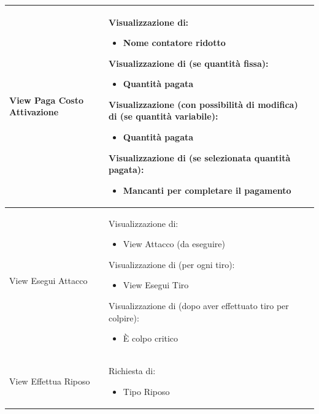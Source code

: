 \documentclass[a4paper, 11pt]{article}
\begin{document}
\begin{adjustwidth}{-1.5cm}{-1.5cm}
\begin{center}
\begin{longtable}{|p{5cm}|p{5cm}|p{5cm}|}
        View Paga Costo Attivazione & 
        Visualizzazione di:
        \begin{itemize}
            \item Nome contatore ridotto
        \end{itemize} 
        
        Visualizzazione di (se quantità fissa):
        \begin{itemize}
            \item Quantità pagata
        \end{itemize} 
        
        Visualizzazione (con possibilità di modifica) di (se quantità variabile):
        \begin{itemize}
            \item Quantità pagata
        \end{itemize} 
        
        Visualizzazione di (se selezionata quantità pagata):
        \begin{itemize}
            \item Mancanti per completare il pagamento
        \end{itemize} &  \\ \hline
        
        View Esegui Attacco & 
        Visualizzazione di:
        \begin{itemize}
            \item View Attacco (da eseguire)
        \end{itemize} 
        
        Visualizzazione di (per ogni tiro):
        \begin{itemize}
            \item View Esegui Tiro
        \end{itemize} 
        
        Visualizzazione di (dopo aver effettuato tiro per colpire):
        \begin{itemize}
            \item È colpo critico
        \end{itemize} &  \\ \hline
        
        View Effettua Riposo & 
        Richiesta di:
        \begin{itemize}
            \item Tipo Riposo
        \end{itemize} 
        

\end{longtable}
\end{center}
\end{adjustwidth}
\end{document}
